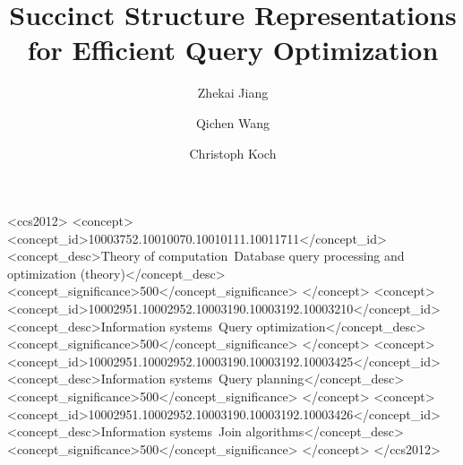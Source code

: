 \documentclass[acmsmall,dvipsnames]{acmart}
\begin{document}
\title{Succinct Structure Representations for Efficient Query Optimization}
\author{Zhekai Jiang}

\author{Qichen Wang}
\authornotemark[1]

\author{Christoph Koch}



\begin{CCSXML}
<ccs2012>
   <concept>
       <concept_id>10003752.10010070.10010111.10011711</concept_id>
       <concept_desc>Theory of computation~Database query processing and optimization (theory)</concept_desc>
       <concept_significance>500</concept_significance>
       </concept>
   <concept>
       <concept_id>10002951.10002952.10003190.10003192.10003210</concept_id>
       <concept_desc>Information systems~Query optimization</concept_desc>
       <concept_significance>500</concept_significance>
       </concept>
   <concept>
       <concept_id>10002951.10002952.10003190.10003192.10003425</concept_id>
       <concept_desc>Information systems~Query planning</concept_desc>
       <concept_significance>500</concept_significance>
       </concept>
   <concept>
       <concept_id>10002951.10002952.10003190.10003192.10003426</concept_id>
       <concept_desc>Information systems~Join algorithms</concept_desc>
       <concept_significance>500</concept_significance>
       </concept>
 </ccs2012>
\end{CCSXML}



\maketitle
\sloppy
\end{document}
